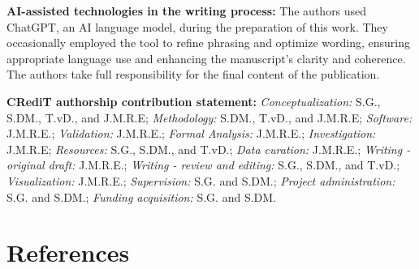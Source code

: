 \documentclass[
  authoryear,
  preprint,
  1p]{elsarticle}
\begin{document}
\textbf{AI-assisted technologies in the writing process:} The authors
used ChatGPT, an AI language model, during the preparation of this work.
They occasionally employed the tool to refine phrasing and optimize
wording, ensuring appropriate language use and enhancing the
manuscript's clarity and coherence. The authors take full responsibility
for the final content of the publication.

\textbf{CRediT authorship contribution statement:}
\emph{Conceptualization:} S.G., S.DM., T.vD., and J.M.R.E;
\emph{Methodology:} S.DM., T.vD., and J.M.R.E; \emph{Software:}
J.M.R.E.; \emph{Validation:} J.M.R.E.; \emph{Formal Analysis:} J.M.R.E.;
\emph{Investigation:} J.M.R.E; \emph{Resources:} S.G., S.DM., and T.vD.;
\emph{Data curation:} J.M.R.E.; \emph{Writing - original draft:}
J.M.R.E.; \emph{Writing - review and editing:} S.G., S.DM., and T.vD.;
\emph{Visualization:} J.M.R.E.; \emph{Supervision:} S.G. and S.DM.;
\emph{Project administration:} S.G. and S.DM.; \emph{Funding
acquisition:} S.G. and S.DM.

\newpage{}

\section*{References}\label{references}

\renewcommand{\bibsection}{}

\end{document}
